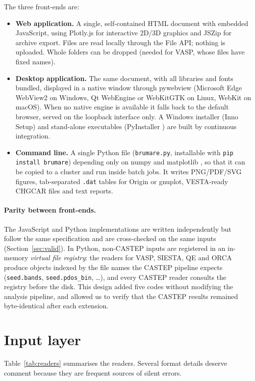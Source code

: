 \documentclass[11pt,a4paper]{article}
\newcommand{\code}[1]{\texttt{#1}}
\begin{document}
The three front-ends are:
\begin{itemize}
  \item \textbf{Web application.} A single, self-contained HTML document with embedded JavaScript, using Plotly.js for interactive 2D/3D graphics and JSZip for archive export. Files are read locally through the File API; nothing is uploaded. Whole folders can be dropped (needed for VASP, whose files have fixed names).
  \item \textbf{Desktop application.} The same document, with all libraries and fonts bundled, displayed in a native window through pywebview \cite{pywebview} (Microsoft Edge WebView2 on Windows, Qt WebEngine or WebKitGTK on Linux, WebKit on macOS). When no native engine is available it falls back to the default browser, served on the loopback interface only. A Windows installer (Inno Setup) and stand-alone executables (PyInstaller \cite{pyinstaller}) are built by continuous integration.
  \item \textbf{Command line.} A single Python file (\code{brumare.py}, installable with \code{pip install brumare}) depending only on numpy \cite{harris2020numpy} and matplotlib \cite{hunter2007matplotlib}, so that it can be copied to a cluster and run inside batch jobs. It writes PNG/PDF/SVG figures, tab-separated \code{.dat} tables for Origin or gnuplot, VESTA-ready CHGCAR files and text reports.
\end{itemize}

\paragraph{Parity between front-ends.} The JavaScript and Python implementations are written independently but follow the same specification and are cross-checked on the same inputs (Section~\ref{sec:valid}). In Python, non-CASTEP inputs are registered in an in-memory \emph{virtual file registry}: the readers for VASP, SIESTA, QE and ORCA produce objects indexed by the file names the CASTEP pipeline expects (\code{seed.bands}, \code{seed.pdos\_bin}, \ldots), and every CASTEP reader consults the registry before the disk. This design added five codes without modifying the analysis pipeline, and allowed us to verify that the CASTEP results remained byte-identical after each extension.

\section{Input layer}\label{sec:input}
Table~\ref{tab:readers} summarises the readers. Several format details deserve comment because they are frequent sources of silent errors.
\end{document}

